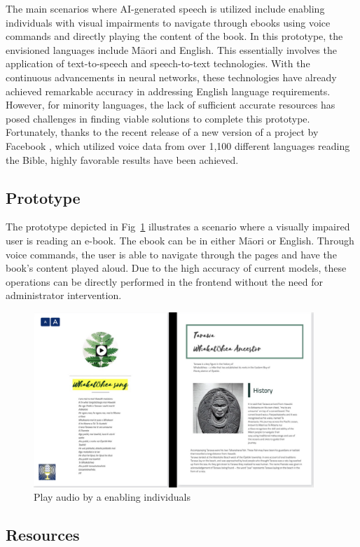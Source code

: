 The main scenarios where AI-generated speech is utilized include enabling individuals with visual impairments to navigate through ebooks using voice commands and directly playing the content of the book. 
In this prototype, the envisioned languages include Māori and English. 
This essentially involves the application of text-to-speech and speech-to-text technologies. 
With the continuous advancements in neural networks, these technologies have already achieved remarkable accuracy in addressing English language requirements. 
However, for minority languages, the lack of sufficient accurate resources has posed challenges in finding viable solutions to complete this prototype. 
Fortunately, thanks to the recent release of a new version of a project by Facebook \autocite{Introduc20:online}, which utilized voice data from over 1,100 different languages reading the Bible, highly favorable results have been achieved.

\subsection{Prototype}

The prototype depicted in Fig~\ref{s-2} illustrates a scenario where a visually impaired user is reading an e-book. 
The ebook can be in either Māori or English. 
Through voice commands, the user is able to navigate through the pages and have the book's content played aloud. 
Due to the high accuracy of current models, these operations can be directly performed in the frontend without the need for administrator intervention.

\begin{figure}[htbp]
  \centerline{\includegraphics[width=300pt]{images/s-2.png}}
  \caption{Play audio by a enabling individuals}
  \label{s-2}
\end{figure}

\subsection{Resources}

